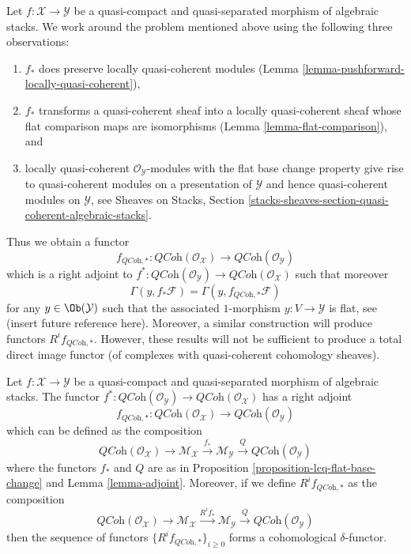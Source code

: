 \medskip\noindent
Let $f : \mathcal{X} \to \mathcal{Y}$ be a quasi-compact and
quasi-separated morphism of algebraic stacks. We work around the problem
mentioned above using the following three observations:
\begin{enumerate}
\item $f_*$ does preserve locally quasi-coherent
modules (Lemma \ref{lemma-pushforward-locally-quasi-coherent}),
\item $f_*$ transforms a quasi-coherent sheaf into a locally quasi-coherent
sheaf whose flat comparison maps are isomorphisms
(Lemma \ref{lemma-flat-comparison}), and
\item locally quasi-coherent $\mathcal{O}_\mathcal{Y}$-modules
with the flat base change property give rise to quasi-coherent
modules on a presentation of $\mathcal{Y}$ and hence quasi-coherent
modules on $\mathcal{Y}$, see
Sheaves on Stacks, Section
\ref{stacks-sheaves-section-quasi-coherent-algebraic-stacks}.
\end{enumerate}
Thus we obtain a functor
$$
f_{\textit{QCoh}, *} :
\textit{QCoh}(\mathcal{O}_\mathcal{X})
\longrightarrow
\textit{QCoh}(\mathcal{O}_\mathcal{Y})
$$
which is a right adjoint to
$f^* : \textit{QCoh}(\mathcal{O}_\mathcal{Y}) \to
\textit{QCoh}(\mathcal{O}_\mathcal{X})$
such that moreover
$$
\Gamma(y, f_*\mathcal{F}) = \Gamma(y, f_{\textit{QCoh}, *}\mathcal{F})
$$
for any $y \in \Ob(\mathcal{Y})$ such that the associated
$1$-morphism $y : V \to \mathcal{Y}$ is flat, see (insert future
reference here).
Moreover, a similar construction will produce functors
$R^if_{\textit{QCoh}, *}$.
However, these results will not be sufficient to produce a
total direct image functor (of complexes with quasi-coherent
cohomology sheaves).

\begin{proposition}
\label{proposition-direct-image-quasi-coherent}
Let $f : \mathcal{X} \to \mathcal{Y}$ be a quasi-compact and quasi-separated
morphism of algebraic stacks. The functor
$f^* : \textit{QCoh}(\mathcal{O}_\mathcal{Y}) \to
\textit{QCoh}(\mathcal{O}_\mathcal{X})$
has a right adjoint
$$
f_{\textit{QCoh}, *} :
\textit{QCoh}(\mathcal{O}_\mathcal{X})
\longrightarrow
\textit{QCoh}(\mathcal{O}_\mathcal{Y})
$$
which can be defined as the composition
$$
\textit{QCoh}(\mathcal{O}_\mathcal{X}) \to \mathcal{M}_\mathcal{X}
\xrightarrow{f_*} \mathcal{M}_\mathcal{Y}
\xrightarrow{Q} \textit{QCoh}(\mathcal{O}_\mathcal{Y})
$$
where the functors $f_*$ and $Q$ are as in
Proposition \ref{proposition-lcq-flat-base-change}
and
Lemma \ref{lemma-adjoint}.
Moreover, if we define $R^if_{\textit{QCoh}, *}$ as the composition
$$
\textit{QCoh}(\mathcal{O}_\mathcal{X}) \to \mathcal{M}_\mathcal{X}
\xrightarrow{R^if_*} \mathcal{M}_\mathcal{Y}
\xrightarrow{Q} \textit{QCoh}(\mathcal{O}_\mathcal{Y})
$$
then the sequence of functors $\{R^if_{\textit{QCoh}, *}\}_{i \geq 0}$
forms a cohomological $\delta$-functor.
\end{proposition}

